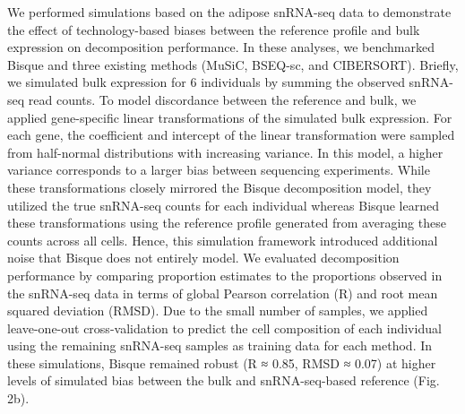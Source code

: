 We performed simulations based on the adipose snRNA-seq data to demonstrate the effect of technology-based biases between the reference profile and bulk expression on decomposition performance. In these analyses, we benchmarked Bisque and three existing methods (MuSiC, BSEQ-sc, and CIBERSORT). Briefly, we simulated bulk expression for 6 individuals by summing the observed snRNA-seq read counts. To model discordance between the reference and bulk, we applied gene-specific linear transformations of the simulated bulk expression. For each gene, the coefficient and intercept of the linear transformation were sampled from half-normal distributions with increasing variance. In this model, a higher variance corresponds to a larger bias between sequencing experiments. While these transformations closely mirrored the Bisque decomposition model, they utilized the true snRNA-seq counts for each individual whereas Bisque learned these transformations using the reference profile generated from averaging these counts across all cells. Hence, this simulation framework introduced additional noise that Bisque does not entirely model. We evaluated decomposition performance by comparing proportion estimates to the proportions observed in the snRNA-seq data in terms of global Pearson correlation (R) and root mean squared deviation (RMSD). Due to the small number of samples, we applied leave-one-out cross-validation to predict the cell composition of each individual using the remaining snRNA-seq samples as training data for each method. In these simulations, Bisque remained robust (R ≈ 0.85, RMSD ≈ 0.07) at higher levels of simulated bias between the bulk and snRNA-seq-based reference (Fig. 2b).
	 	 	
